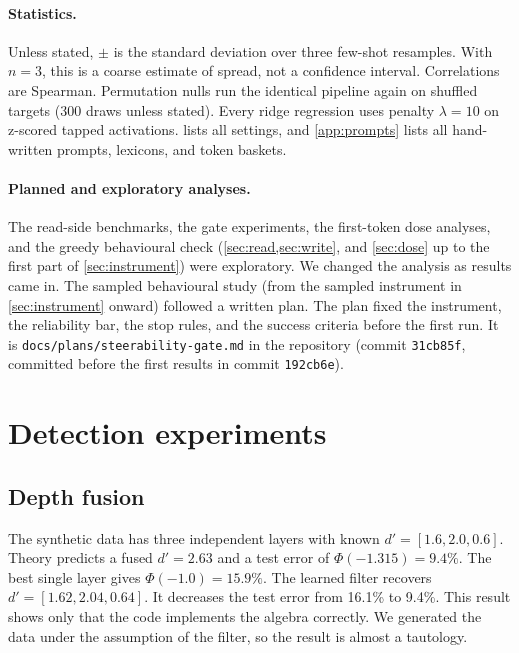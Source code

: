\documentclass[11pt]{article}
\begin{document}
\paragraph{Statistics.} Unless stated, $\pm$ is the standard deviation over three few-shot resamples.
With $n=3$, this is a coarse estimate of spread, not a confidence interval. Correlations are Spearman.
Permutation nulls run the identical pipeline again on shuffled targets (300 draws unless stated). Every
ridge regression uses penalty $\lambda=10$ on z-scored tapped activations.  lists all
settings, and \cref{app:prompts} lists all hand-written prompts, lexicons, and token baskets.

\paragraph{Planned and exploratory analyses.} The read-side benchmarks, the gate experiments, the first-token dose analyses, and the greedy behavioural check (\cref{sec:read,sec:write}, and \cref{sec:dose}
up to the first part of \cref{sec:instrument}) were exploratory. We changed the analysis as results came
in. The sampled behavioural study (from the sampled instrument in \cref{sec:instrument} onward) followed a
written plan. The plan fixed the instrument, the reliability bar,
the stop rules, and the success criteria before the first run. It is
\texttt{docs/plans/steerability-gate.md} in the repository (commit \texttt{31cb85f}, committed before the
first results in commit \texttt{192cb6e}).

\section{Detection experiments}
\label{sec:read}

\subsection{Depth fusion}
\label{sec:fusion}
The synthetic data has three independent layers with known $d'=[1.6, 2.0, 0.6]$. Theory predicts a fused
$d'=2.63$ and a test error of $\Phi(-1.315)=9.4\%$. The best single layer gives $\Phi(-1.0)=15.9\%$. The
learned filter recovers $d'=[1.62,2.04,0.64]$. It decreases the test error from 16.1\% to 9.4\%. This
result shows only that the code implements the algebra correctly. We generated the data under the
assumption of the filter, so the result is almost a tautology.
\end{document}
